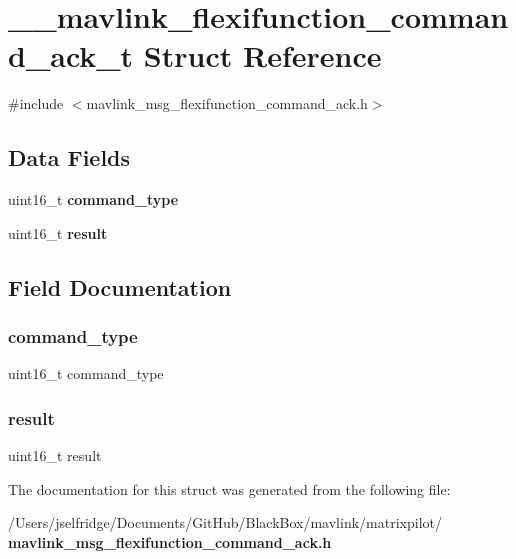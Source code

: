 \section{\+\_\+\+\_\+mavlink\+\_\+flexifunction\+\_\+command\+\_\+ack\+\_\+t Struct Reference}
\label{struct____mavlink__flexifunction__command__ack__t}


{\ttfamily \#include $<$mavlink\+\_\+msg\+\_\+flexifunction\+\_\+command\+\_\+ack.\+h$>$}

\subsection*{Data Fields}
\begin{DoxyCompactItemize}
\item 
uint16\+\_\+t \textbf{ command\+\_\+type}
\item 
uint16\+\_\+t \textbf{ result}
\end{DoxyCompactItemize}


\subsection{Field Documentation}
\mbox{\label{struct____mavlink__flexifunction__command__ack__t_a07f7ee802870e9ae75f021832f59a8a9}} 
\subsubsection{command\+\_\+type}
{\footnotesize\ttfamily uint16\+\_\+t command\+\_\+type}

\mbox{\label{struct____mavlink__flexifunction__command__ack__t_abfd24350fd0f519cf2cc67a7827ab6fa}} 
\subsubsection{result}
{\footnotesize\ttfamily uint16\+\_\+t result}



The documentation for this struct was generated from the following file\+:\begin{DoxyCompactItemize}
\item 
/\+Users/jselfridge/\+Documents/\+Git\+Hub/\+Black\+Box/mavlink/matrixpilot/\textbf{ mavlink\+\_\+msg\+\_\+flexifunction\+\_\+command\+\_\+ack.\+h}\end{DoxyCompactItemize}
